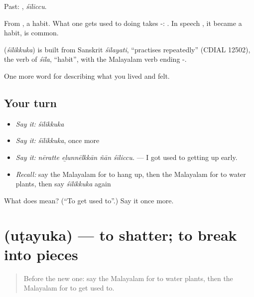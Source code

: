 Past: , \emph{śīliccu}.

From , a habit. What one gets used to doing takes -:  . In speech , it became a habit, is common.

\begin{cousinweb}
\textbf{} (\emph{śīlikkuka}) is built from Sanskrit \emph{śīlayati}, \textquotedblleft{}practises repeatedly\textquotedblright{} (CDIAL 12502), the verb of \emph{śīla}, \textquotedblleft{}habit\textquotedblright{}, with the Malayalam verb ending -.
\end{cousinweb}

\begin{grammarlens}[title={What you've built}]
One more word for describing what you lived and felt.
\end{grammarlens}

\subsection*{Your turn}
\begin{itemize}
\raggedright
  \item \emph{Say it:} \emph{śīlikkuka}
  \item \emph{Say it:} \emph{śīlikkuka}, once more
  \item \emph{Say it:} \emph{nēratte eḻunnēlkkān ñān śīliccu.} — I got used to getting up early.
  \item \emph{Recall:} say the Malayalam for to hang up, then the Malayalam for to water plants, then say \emph{śīlikkuka} again
\end{itemize}

\begin{tcolorbox}[breakable,colback=teal!4,colframe=teal!35!black,title={Before you move on}]
What does  mean? (\textquotedblleft{}To get used to\textquotedblright{}.) Say it once more.
\end{tcolorbox}
\section[\texorpdfstring{\ml{ഉടയുക} (uṭayuka)}{ഉടയുക (uṭayuka)}]{ (uṭayuka) — to shatter; to break into pieces}

\label{lesson:ML-C572-utayuka}



\begin{quote}
Before the new one: say the Malayalam for to water plants, then the Malayalam for to get used to.
\end{quote}


